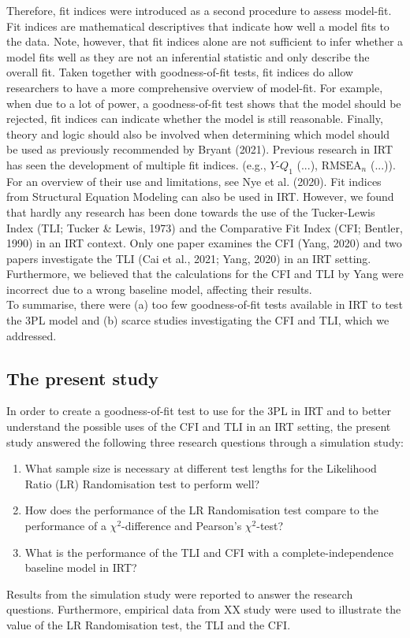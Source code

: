 \documentclass[Royal,sageapa,times,doublespace]{sagej}
\begin{document}
\indent Therefore, fit indices were introduced as a second procedure to assess model-fit. Fit indices are mathematical descriptives that indicate how well a model fits to the data. Note, however, that fit indices alone are not sufficient to infer whether a model fits well as they are not an inferential statistic and only describe the overall fit. Taken together with goodness-of-fit tests, fit indices do allow researchers to have a more comprehensive overview of model-fit. For example, when due to a lot of power, a goodness-of-fit test shows that the model should be rejected, fit indices can indicate whether the model is still reasonable. Finally, theory and logic should also be involved when determining which model should be used as previously recommended by Bryant (2021). Previous research in IRT has seen the development of multiple fit indices. (e.g., $Y\text{-}Q_1$ (...), $\text{RMSEA}_n$ (...)). For an overview of their use and limitations, see Nye et al. (2020). Fit indices from Structural Equation Modeling can also be used in IRT. However, we found that hardly any research has been done towards the use of the Tucker-Lewis Index (TLI; Tucker \& Lewis, 1973) and the Comparative Fit Index (CFI; Bentler, 1990) in an IRT context. Only one paper examines the CFI (Yang, 2020) and two papers investigate the TLI  (Cai et al., 2021; Yang, 2020) in an IRT setting. Furthermore, we believed that the calculations for the CFI and TLI by Yang were incorrect due to a wrong baseline model, affecting their results. \\
\indent To summarise, there were (a) too few goodness-of-fit tests available in IRT to test the 3PL model and (b) scarce studies investigating the CFI and TLI, which we addressed.

\subsection{The present study}
In order to create a goodness-of-fit test to use for the 3PL in IRT and to better understand the possible uses of the CFI and TLI in an IRT setting, the present study answered the following three research questions through a simulation study:
\begin{enumerate}
\item{What sample size is necessary at different test lengths for the Likelihood Ratio (LR) Randomisation test to perform well?}
\item{How does the performance of the LR Randomisation test compare to the performance of a $\chi^2$-difference and Pearson's $\chi^2$-test?}
\item{What is the performance of the TLI and CFI with a complete-independence baseline model in IRT?}
\end{enumerate}
Results from the simulation study were reported to answer the research questions. Furthermore, empirical data from XX study were used to illustrate the value of the LR Randomisation test, the TLI and the CFI.
\end{document}
